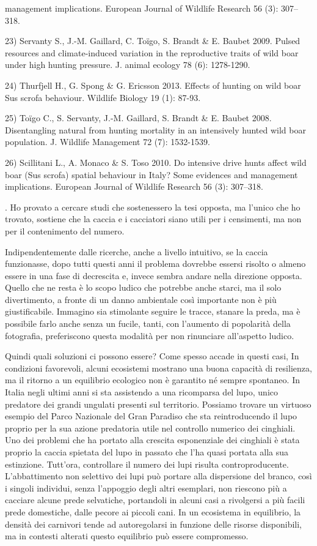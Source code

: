 \documentclass[12pt]{book} %
\begin{document}
\begin{mdframed}[linewidth=1pt]
{management implications. European Journal of Wildlife Research 56 (3): 307–318.\par 23) Servanty S., J.-M. Gaillard, C.
Toïgo, S. Brandt \& E. Baubet 2009. Pulsed resources and climate-induced variation in the reproductive traits of wild
boar under high hunting pressure. J. animal ecology 78 (6): 1278-1290.\par 24) Thurfjell H., G. Spong \& G. Ericsson
2013. Effects of hunting on wild boar Sus scrofa behaviour. Wildlife Biology 19 (1): 87-93.\par 25) Toïgo C., S.
Servanty, J.-M. Gaillard, S. Brandt \& E. Baubet 2008. Disentangling natural from hunting mortality in an intensively
hunted wild boar population. J. Wildlife Management 72 (7): 1532-1539.\par 26) Scillitani L., A. Monaco \& S. Toso
2010. Do intensive drive hunts affect wild boar (Sus scrofa) spatial behaviour in Italy? Some evidences and management
implications. European Journal of Wildlife Research 56 (3): 307–318. }. Ho provato a cercare studi che sostenessero la
tesi opposta, ma l'unico che ho trovato, sostiene che la caccia e i cacciatori siano utili per i
censimenti, ma non per il contenimento del numero. 

Indipendentemente dalle ricerche, anche a livello intuitivo, se la caccia funzionasse, dopo tutti questi anni il
problema dovrebbe essersi risolto o almeno essere in una fase di decrescita e, invece sembra andare nella direzione opposta. 
Quello che ne resta è lo scopo ludico che potrebbe anche starci, ma il solo divertimento, a fronte di un danno
ambientale così importante non è più giustificabile. Immagino sia stimolante seguire le tracce, stanare la preda, ma è
possibile farlo anche senza un fucile, tanti, con l'aumento di popolarità della fotografia,
preferiscono questa modalità per non rinunciare all'aspetto ludico.

Quindi quali soluzioni ci possono essere? Come spesso accade in questi casi, In condizioni favorevoli, alcuni ecosistemi mostrano una buona capacità di resilienza, ma il ritorno a un equilibrio ecologico non è garantito né sempre spontaneo. In Italia negli ultimi anni si sta assistendo a una ricomparsa del
lupo, unico predatore dei grandi ungulati presenti sul territorio. Possiamo trovare un virtuoso esempio del Parco
Nazionale del Gran Paradiso che sta reintroducendo il lupo proprio per la sua azione predatoria utile nel controllo
numerico dei cinghiali. Uno dei problemi che ha portato alla crescita esponenziale dei cinghiali è stata proprio la
caccia spietata del lupo in passato che l'ha quasi portata alla sua estinzione.
Tutt'ora, controllare il numero dei lupi risulta controproducente. L’abbattimento non selettivo dei lupi può portare alla dispersione del branco, così i singoli individui, senza l'appoggio degli altri esemplari, non riescono più a cacciare alcune prede selvatiche, portandoli in alcuni casi a rivolgersi a più facili prede domestiche, dalle
pecore ai piccoli cani. In un ecosistema in equilibrio, la densità dei carnivori tende ad autoregolarsi in funzione delle risorse disponibili, ma in contesti alterati questo equilibrio può essere compromesso.


\end{mdframed}
\end{document}
